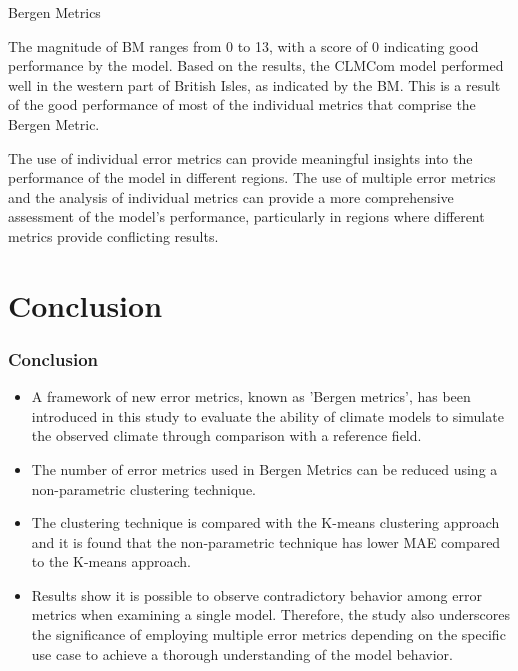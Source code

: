 \documentclass[xcolor={dvipsnames}]{beamer}
\begin{document}
\begin{frame}{Bergen Metrics}

The magnitude of BM ranges from 0 to 13, with a score of 0 indicating good performance by the model. Based on the results, the CLMCom model performed well in the western part of British Isles, as indicated by the BM. This is a result of the good performance of most of the individual metrics that comprise the Bergen Metric.

\hfill

The use of individual error metrics can provide meaningful insights into the performance of the model in different regions. The use of multiple error metrics and the analysis of individual metrics can provide a more comprehensive assessment of the model's performance, particularly in regions where different metrics provide conflicting results.
    
\end{frame}

\section{Conclusion}

\begin{frame}
\frametitle{Conclusion}

\begin{itemize}

    \item A framework of new error metrics, known as 'Bergen metrics', has been introduced in this study to evaluate the ability of climate models to simulate the observed climate through comparison  with a reference field.

    \item The number of error metrics used in Bergen Metrics can be reduced using a non-parametric clustering technique.

    \item The clustering technique is compared with the K-means clustering approach and it is found that the non-parametric technique has lower MAE compared to the K-means approach.

    \item Results show it is possible to observe contradictory behavior among error metrics when examining a single model. Therefore, the study also underscores the significance of employing multiple error metrics depending on the specific use case to achieve a thorough understanding of the model behavior.

\end{itemize}

\end{frame}
\end{document}
